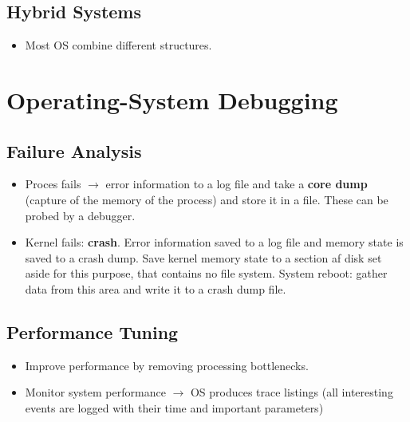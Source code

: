 \documentclass[10pt]{report}
\begin{document}
        \subsection{Hybrid Systems}
          \begin{itemize}
            \item Most OS combine different structures.
          \end{itemize}

      \section{Operating-System Debugging}
        \subsection{Failure Analysis}
          \begin{itemize}
            \item Proces fails $\rightarrow$ error information to a log file and take a \textbf{core dump} (capture of the memory of the process) and store it in a file. These can be probed by a debugger.
            \item Kernel fails: \textbf{crash}. Error information saved to a log file and memory state is saved to a crash dump. Save kernel memory state to a section af disk set aside for this purpose, that contains no file system. System reboot: gather data from this area and write it to a crash dump file.
          \end{itemize}

        \subsection{Performance Tuning}
          \begin{itemize}
            \item Improve performance by removing processing bottlenecks.
            \item Monitor system performance $\rightarrow$ OS produces trace listings (all interesting events are logged with their time and important parameters)
          \end{itemize}
\end{document}
